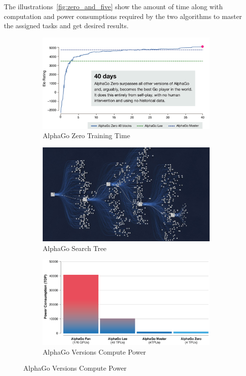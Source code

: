 The illustrations~\ref{fig:zero_and_five} show the amount of time along with computation and power consumptions required by the two algorithms to master the assigned tasks and get desired results.

\begin{figure}[!htb]
	\centering
	\begin{subfigure}[b]{0.3\textwidth}
		\centering
		\includegraphics[width=\textwidth]{figures/rl/alphago_zero.png}
		\caption{AlphaGo Zero Training Time}
		\label{fig:alphago_train}
    \end{subfigure}
	\hfill
	\begin{subfigure}[b]{0.3\textwidth}
		\centering
		\includegraphics[width=\textwidth]{figures/rl/alphago_search_tree.png}
        \caption{AlphaGo Search Tree}
		\label{fig:alphago_search_tree}
	\end{subfigure}
	\hfill
	\begin{subfigure}[b]{0.3\textwidth}
		\centering
		\includegraphics[width=\textwidth]{figures/rl/alphago_power.png}
        \caption{AlphaGo Versions Compute Power}
		\label{fig:alphago_power}
	\end{subfigure}
	\hfill


\end{figure}
